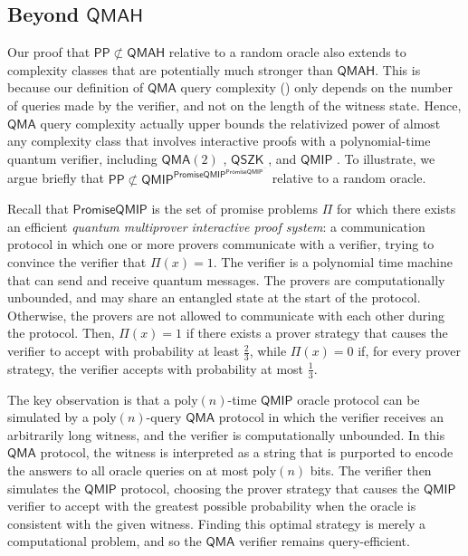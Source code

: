 \documentclass[11pt]{article}%
\newcommand{\poly}{\mathrm{poly}}
\begin{document}
\subsection{Beyond \texorpdfstring{$\mathsf{QMAH}$}{QMAH}}
Our proof that $\mathsf{PP} \not\subset \mathsf{QMAH}$ relative to a random oracle also extends to complexity classes that are potentially much stronger than $\mathsf{QMAH}$. This is because our definition of $\mathsf{QMA}$ query complexity () only depends on the number of queries made by the verifier, and not on the length of the witness state. Hence, $\mathsf{QMA}$ query complexity actually upper bounds the relativized power of almost any complexity class that involves interactive proofs with a polynomial-time quantum verifier, including $\mathsf{QMA}(2)$ \cite{KMY03}, $\mathsf{QSZK}$ \cite{Wat02}, and $\mathsf{QMIP}$ \cite{KM02}. To illustrate, we argue briefly that $\mathsf{PP} \not\subset \mathsf{QMIP}^{\mathsf{PromiseQMIP}^{\mathsf{PromiseQMIP}^{\cdots}}}$ relative to a random oracle.

Recall that $\mathsf{PromiseQMIP}$ is the set of promise problems $\Pi$ for which there exists an efficient \textit{quantum multiprover interactive proof system}: a communication protocol in which one or more provers communicate with a verifier, trying to convince the verifier that $\Pi(x) = 1$. The verifier is a polynomial time machine that can send and receive quantum messages. The provers are computationally unbounded, and may share an entangled state at the start of the protocol. Otherwise, the provers are not allowed to communicate with each other during the protocol. Then, $\Pi(x) = 1$ if there exists a prover strategy that causes the verifier to accept with probability at least $\frac{2}{3}$, while $\Pi(x) = 0$ if, for every prover strategy, the verifier accepts with probability at most $\frac{1}{3}$.

The key observation is that a $\poly(n)$-time $\mathsf{QMIP}$ oracle protocol can be simulated by a $\poly(n)$-query $\mathsf{QMA}$ protocol in which the verifier receives an arbitrarily long witness, and the verifier is computationally unbounded. In this $\mathsf{QMA}$ protocol, the witness is interpreted as a string that is purported to encode the answers to all oracle queries on at most $\poly(n)$ bits. The verifier then simulates the $\mathsf{QMIP}$ protocol, choosing the prover strategy that causes the $\mathsf{QMIP}$ verifier to accept with the greatest possible probability when the oracle is consistent with the given witness. Finding this optimal strategy is merely a computational problem, and so the $\mathsf{QMA}$ verifier remains query-efficient.
\end{document}
